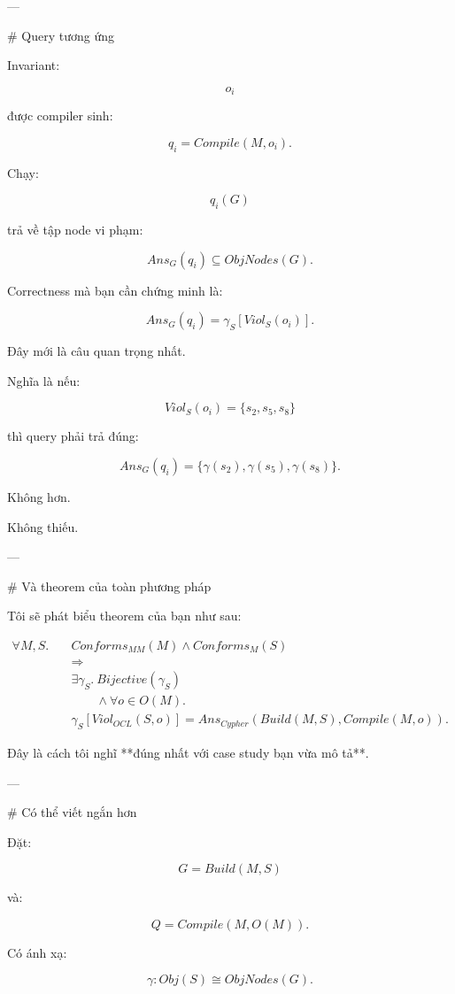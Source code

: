 ---

# Query tương ứng

Invariant:

$$
o_i
$$

được compiler sinh:

$$
q_i=Compile(M,o_i).
$$

Chạy:

$$
q_i(G)
$$

trả về tập node vi phạm:

$$
\boxed{
Ans_G(q_i)\subseteq ObjNodes(G).
}
$$

Correctness mà bạn cần chứng minh là:

$$
\boxed{
Ans_G(q_i)
=
\gamma_S[Viol_S(o_i)].
}
\tag{1}
$$

Đây mới là câu quan trọng nhất.

Nghĩa là nếu:

$$
Viol_S(o_i)=\{s_2,s_5,s_8\}
$$

thì query phải trả đúng:

$$
Ans_G(q_i)
=
\{
\gamma(s_2),
\gamma(s_5),
\gamma(s_8)
\}.
$$

Không hơn.

Không thiếu.

---

# Và theorem của toàn phương pháp

Tôi sẽ phát biểu theorem của bạn như sau:

$$
\boxed{
\begin{aligned}
\forall M,S.\quad
&
Conforms_{MM}(M)
\land
Conforms_M(S)
\\
&\Longrightarrow
\\
&
\exists\gamma_S.
\ Bijective(\gamma_S)
\\
&\qquad{}\land
\forall o\in O(M).
\\
&
\gamma_S[Viol_{OCL}(S,o)]
=
Ans_{Cypher}
\left(
Build(M,S),
Compile(M,o)
\right).
\end{aligned}
}
\tag{MASTER}
$$

Đây là cách tôi nghĩ **đúng nhất với case study bạn vừa mô tả**.

---

# Có thể viết ngắn hơn

Đặt:

$$
G = Build(M,S)
$$

và:

$$
Q=Compile(M,O(M)).
$$

Có ánh xạ:

$$
\gamma:Obj(S)\cong ObjNodes(G).
$$

